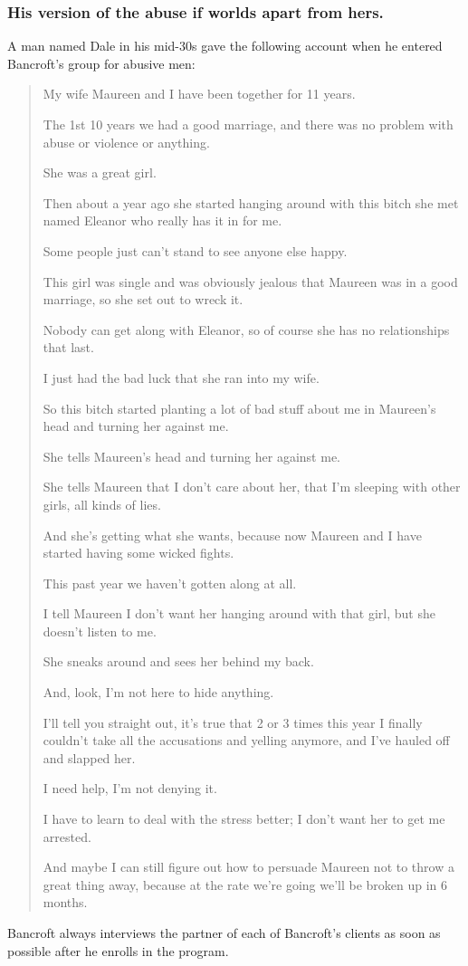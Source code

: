 \documentclass[oneside]{article}
\numberwithin{equation}{section}
\begin{document}
\subsubsection{His version of the abuse if worlds apart from hers.}
A man named Dale in his mid-30s gave the following account when he entered Bancroft's group for abusive men:
\begin{quotation}
    My wife Maureen and I have been together for 11 years.
    
    The 1st 10 years we had a good marriage, and there was no problem with abuse or violence or anything.
    
    She was a great girl.
    
    Then about a year ago she started hanging around with this bitch she met named Eleanor who really has it in for me.
    
    Some people just can't stand to see anyone else happy.
    
    This girl was single and was obviously jealous that Maureen was in a good marriage, so she set out to wreck it.
    
    Nobody can get along with Eleanor, so of course she has no relationships that last.
    
    I just had the bad luck that she ran into my wife.
    
    So this bitch started planting a lot of bad stuff about me in Maureen's head and turning her against me.
    
    She tells Maureen's head and turning her against me.
    
    She tells Maureen that I don't care about her, that I'm sleeping with other girls, all kinds of lies.
    
    And she's getting what she wants, because now Maureen and I have started having some wicked fights.
    
    This past year we haven't gotten along at all.
    
    I tell Maureen I don't want her hanging around with that girl, but she doesn't listen to me.
    
    She sneaks around and sees her behind my back.
    
    And, look, I'm not here to hide anything.
    
    I'll tell you straight out, it's true that 2 or 3 times this year I finally couldn't take all the accusations and yelling anymore, and I've hauled off and slapped her.
    
    I need help, I'm not denying it.
    
    I have to learn to deal with the stress better; I don't want her to get me arrested.
    
    And maybe I can still figure out how to persuade Maureen not to throw a great thing away, because at the rate we're going we'll be broken up in 6 months.
\end{quotation}
Bancroft always interviews the partner of each of Bancroft's clients as soon as possible after he enrolls in the program.
\end{document}
